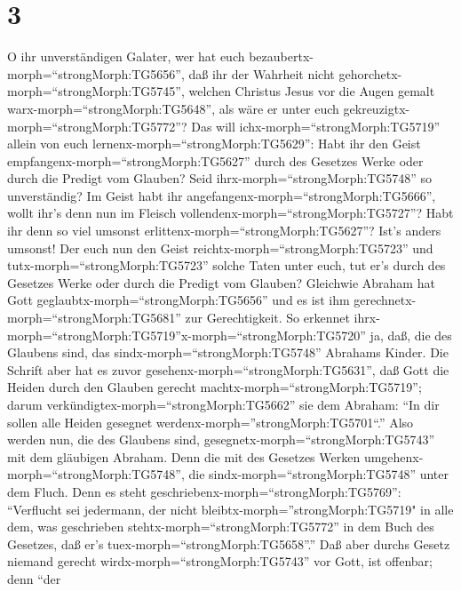 \hypertarget{section-2}{%
\section{3}\label{section-2}}

 O ihr unverständigen Galater, wer hat euch
bezaubertx-morph=``strongMorph:TG5656'', daß ihr der Wahrheit nicht
gehorchetx-morph=``strongMorph:TG5745'', welchen Christus Jesus vor die
Augen gemalt warx-morph=``strongMorph:TG5648'', als wäre er unter euch
gekreuzigtx-morph=``strongMorph:TG5772''?  Das will
ichx-morph=``strongMorph:TG5719'' allein von euch
lernenx-morph=``strongMorph:TG5629'': Habt ihr den Geist
empfangenx-morph=``strongMorph:TG5627'' durch des Gesetzes Werke oder
durch die Predigt vom Glauben?  Seid
ihrx-morph=``strongMorph:TG5748'' so unverständig? Im Geist habt ihr
angefangenx-morph=``strongMorph:TG5666'', wollt ihr's denn nun im
Fleisch vollendenx-morph=``strongMorph:TG5727''?  Habt ihr
denn so viel umsonst erlittenx-morph=``strongMorph:TG5627''? Ist's
anders umsonst!  Der euch nun den Geist
reichtx-morph=``strongMorph:TG5723'' und
tutx-morph=``strongMorph:TG5723'' solche Taten unter euch, tut er's
durch des Gesetzes Werke oder durch die Predigt vom Glauben?
 Gleichwie Abraham hat Gott
geglaubtx-morph=``strongMorph:TG5656'' und es ist ihm
gerechnetx-morph=``strongMorph:TG5681'' zur Gerechtigkeit. 
So erkennet
ihrx-morph=``strongMorph:TG5719''\textbar x-morph=``strongMorph:TG5720''
ja, daß, die des Glaubens sind, das sindx-morph=``strongMorph:TG5748''
Abrahams Kinder.  Die Schrift aber hat es zuvor
gesehenx-morph=``strongMorph:TG5631'', daß Gott die Heiden durch den
Glauben gerecht machtx-morph=``strongMorph:TG5719''; darum
verkündigtex-morph=``strongMorph:TG5662'' sie dem Abraham: ``In dir
sollen alle Heiden gesegnet werdenx-morph=''strongMorph:TG5701``.''
 Also werden nun, die des Glaubens sind,
gesegnetx-morph=``strongMorph:TG5743'' mit dem gläubigen Abraham.
 Denn die mit des Gesetzes Werken
umgehenx-morph=``strongMorph:TG5748'', die
sindx-morph=``strongMorph:TG5748'' unter dem Fluch. Denn es steht
geschriebenx-morph=``strongMorph:TG5769'': ``Verflucht sei jedermann,
der nicht bleibtx-morph=''strongMorph:TG5719" in alle dem, was
geschrieben stehtx-morph=``strongMorph:TG5772'' in dem Buch des
Gesetzes, daß er's tuex-morph=``strongMorph:TG5658''.'' 
Daß aber durchs Gesetz niemand gerecht
wirdx-morph=``strongMorph:TG5743'' vor Gott, ist offenbar; denn ``der
